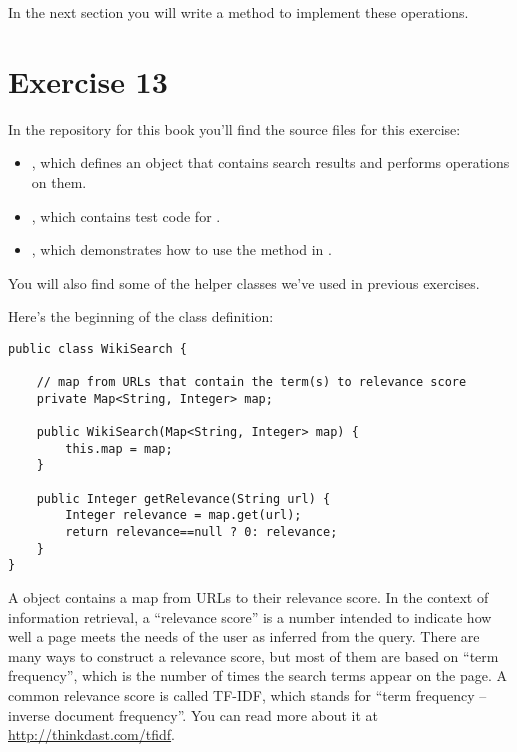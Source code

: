 \documentclass[12pt]{book}
\theoremstyle{exercise}
\begin{document}
In the next section you will write a method to implement these operations.



\section{Exercise 13}
\label{exercise13}

In the repository for this book
you'll find the source files for this exercise:

\begin{itemize}

\item
  , which defines an object that contains search
  results and performs operations on them.

\item
  , which contains test code for
  .

\item
  , which demonstrates how to use the 
  method in .

\end{itemize}

You will also find some of the helper classes we've used in previous
exercises.


Here's the beginning of the  class definition:

\begin{verbatim}
public class WikiSearch {

    // map from URLs that contain the term(s) to relevance score
    private Map<String, Integer> map;

    public WikiSearch(Map<String, Integer> map) {
        this.map = map;
    }

    public Integer getRelevance(String url) {
        Integer relevance = map.get(url);
        return relevance==null ? 0: relevance;
    }
}
\end{verbatim}

A  object contains a map from URLs to their relevance
score. In the context of information retrieval, a ``relevance score'' is
a number intended to indicate how well a page meets the needs of the
user as inferred from the query. There are many ways to construct a
relevance score, but most of them are based on ``term frequency'', which
is the number of times the search terms appear on the page. A common
relevance score is called TF-IDF, which stands for ``term frequency --
inverse document frequency''.  You can read more about it at
\url{http://thinkdast.com/tfidf}.
\end{document}
